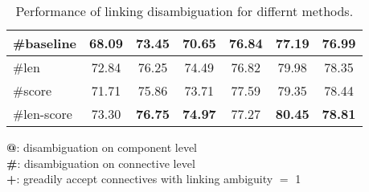 \begin{table}[ht]
\begin{tabular}{|l|c|c|c|c|c|c|}
\hhline{|=|=|=|=|=|=|=|}

   \#baseline               &     68.09     &     73.45  &     70.65     &     76.84     &     77.19  &     76.99    \\ \hline
   \#len                    &     72.84     &     76.25  &     74.49     &     76.82     &     79.98  &     78.35    \\ \hline
   \#score                  &     71.71     &     75.86  &     73.71     &     77.59     &     79.35  &     78.44    \\ \hline
   \#len-score              &     73.30     & \bf 76.75  & \bf 74.97     &     77.27     & \bf 80.45  & \bf 78.81    \\ \hline

\end{tabular}
\begin{flushleft}
\small
\textbf{@}: disambiguation on component level \\
\textbf{\#}: disambiguation on connective level \\
\textbf{+}: greadily accept connectives with linking ambiguity $=$ 1
\end{flushleft}
\caption{\label{t:linking-methods} Performance of linking
disambiguation for differnt methods. }
\end{table}

